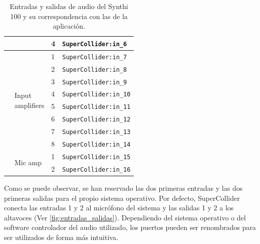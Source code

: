 \begin{table}
\begin{center}
\begin{tabular}{|l|l|l|l| }
			 & & 4 & \texttt{SuperCollider:in\_6}\\			
			 \hline
			 \hline
			\multirow{8}{*}{} &  \multirow{8}{*}{\parbox{5em}{  Input\\ amplifiers}}
			 & 1 & \texttt{SuperCollider:in\_7}\\			
			 & & 2 & \texttt{SuperCollider:in\_8}\\			
			 & & 3 & \texttt{SuperCollider:in\_9}\\			
			 & & 4 & \texttt{SuperCollider:in\_10}\\			
			 & & 5 & \texttt{SuperCollider:in\_11}\\			
			 & & 6 & \texttt{SuperCollider:in\_12}\\			
			 & & 7 & \texttt{SuperCollider:in\_13}\\			
			 & & 8 & \texttt{SuperCollider:in\_14}\\		
			\cline{2-4}
			 \multirow{2}{*}{} &  \multirow{2}{*}{Mic amp}
			 & 1 & \texttt{SuperCollider:in\_15}\\			
			 & & 2 & \texttt{SuperCollider:in\_16}\\			
			 \hline
		\end{tabular}
		\caption[Entradas y salidas de la aplicación]{Entradas y salidas de audio del Synthi 100 y su correspondencia con las de la aplicación.}
		\label{table:inputs_outputs}
	\end{center}
\end{table}

Como se puede observar, se han reservado las dos primeras entradas y las dos primeras salidas para el propio sistema operativo. Por defecto, SuperCollider conecta las entradas 1 y 2 al micrófono del sistema y las salidas 1 y 2 a los altavoces (Ver \ref{fig:entradas_salidas}). Dependiendo del sistema operativo o del software controlador del audio utilizado, los puertos pueden ser renombrados para ser utilizados de forma más intuitiva. 


